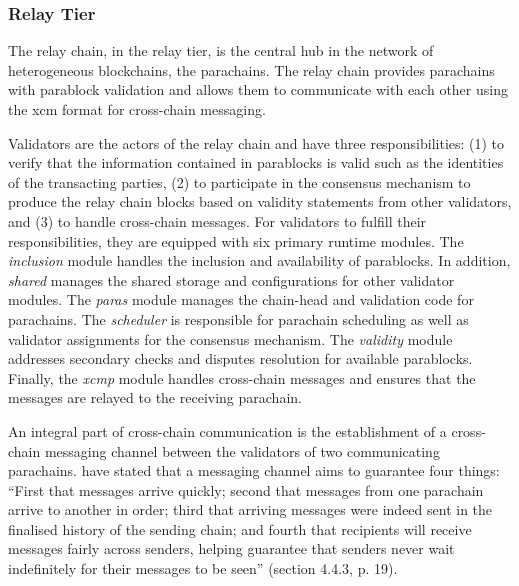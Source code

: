 \documentclass[conference]{IEEEtran}
\begin{document}
\subsubsection{Relay Tier} \label{s:relay_tier}
The relay chain, in the relay tier, is the central hub in the network of heterogeneous blockchains, the parachains. The relay chain provides parachains with parablock validation and allows them to communicate with each other using the \ac{xcm} format for cross-chain messaging.

Validators are the actors of the relay chain and have three responsibilities: (1) to verify that the information contained in parablocks is valid such as the identities of the transacting parties, (2) to participate in the consensus mechanism to produce the relay chain blocks based on validity statements from other validators, and (3) to handle cross-chain messages. For validators to fulfill their responsibilities, they are equipped with six primary runtime modules. The \textit{inclusion} module handles the inclusion and availability of parablocks. In addition, \textit{shared} manages the shared storage and configurations for other validator modules. The \textit{paras} module manages the chain-head and validation code for parachains. The \textit{scheduler} is responsible for parachain scheduling as well as validator assignments for the consensus mechanism. The \textit{validity} module addresses secondary checks and disputes resolution for available parablocks. Finally, the \textit{\ac{xcmp}} module handles cross-chain messages and ensures that the messages are relayed to the receiving parachain. 

An integral part of cross-chain communication is the establishment of a cross-chain messaging channel between the validators of two communicating parachains. \citeauthor{burdges2020overview} \cite{burdges2020overview} have stated that a messaging channel aims to guarantee four things: ``First that messages arrive quickly; second that messages from one parachain arrive to another in order; third that arriving messages were indeed sent in the finalised history of the sending chain; and fourth that recipients will receive messages fairly across senders, helping guarantee that senders never wait indefinitely for their messages to be seen'' (section 4.4.3, p. 19).  
\end{document}
